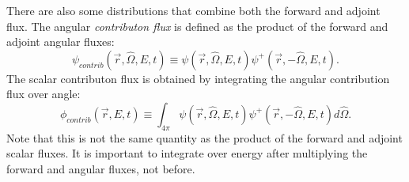 There are also some distributions that combine both the forward and adjoint flux.
The angular \textit{contributon flux} is defined as the product of the forward and adjoint angular fluxes:
\begin{equation}\label{eq:bg:rt:angular-contributon}
  \psi_{contrib}\left(\vec{r},\hat{\Omega},E,t\right) \equiv
  \psi\left(\vec{r},\hat{\Omega},E,t\right)\psi^+\left(\vec{r},-\hat{\Omega},E,t\right).
\end{equation}
The scalar contributon flux is obtained by integrating the angular contribution flux over angle:
\begin{equation}\label{eq:bg:rt:angular-contributon}
  \phi_{contrib}\left(\vec{r},E,t\right) \equiv
  \int_{4\pi}\psi\left(\vec{r},\hat{\Omega},E,t\right)\psi^+\left(\vec{r},-\hat{\Omega},E,t\right)d\hat{\Omega}.
\end{equation}
Note that this is not the same quantity as the product of the forward and adjoint scalar fluxes. It is important to integrate over energy after multiplying the forward and angular fluxes, not before.
